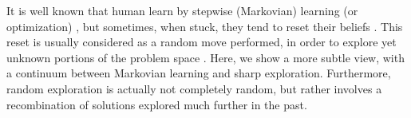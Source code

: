 It is well known that human learn by stepwise (Markovian) learning (or optimization) \cite{}, but sometimes, when stuck, they tend to reset their beliefs \cite{}. This reset is usually considered as a random move performed, in order to explore yet unknown portions of the problem space \cite{}. Here, we show a more subtle view, with a continuum between Markovian learning and sharp exploration. Furthermore, random exploration is actually not completely random, but rather involves a recombination of solutions explored much further in the past. 
